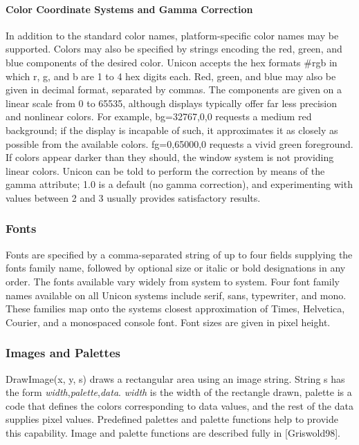 \paragraph{Color Coordinate Systems and Gamma Correction}
In addition to the standard color names, platform-specific color names
may be supported. Colors may also be specified by strings encoding the
red, green, and blue components of the desired color. Unicon accepts
the hex formats {\textquotedbl}\#rgb{\textquotedbl} in which r, g, and
b are 1 to 4 hex digits each. Red, green, and blue may also be given
in decimal format, separated by commas. The components are given on a
linear scale from 0 to 65535, although displays typically offer far
less precision and nonlinear colors. For example,
{\textquotedbl}bg=32767,0,0{\textquotedbl} requests a medium red
background; if the display is incapable of such, it approximates it as
closely as possible from the available colors.
{\textquotedbl}fg=0,65000,0{\textquotedbl} requests a vivid green
foreground. If colors appear darker than they should, the window system
is not providing linear colors. Unicon can be told to perform the
correction by means of the gamma attribute; 1.0 is a default (no gamma
correction), and experimenting with values between 2 and 3 usually
provides satisfactory results.

\subsubsection{Fonts}

Fonts are specified by a comma-separated string of up to four fields
supplying the font{\textquotesingle}s family name, followed by optional
size or italic or bold designations in any order. The fonts available
vary widely from system to system. Four font family names available on
all Unicon systems include serif, sans, typewriter, and mono. These
families map onto the system{\textquotesingle}s closest approximation
of Times, Helvetica, Courier, and a monospaced console font. Font sizes
are given in pixel height.

\subsubsection{Images and Palettes}

DrawImage(x, y, s) draws a rectangular area using an image string.
String s has the form
{\textquotedbl}\textit{width},\textit{palette},\textit{data}{\textquotedbl}.
\textit{width} is the width of the rectangle drawn, palette is a code
that defines the colors corresponding to data values, and the rest of
the data supplies pixel values. Predefined palettes and palette
functions help to provide this capability. Image and palette
functions are described fully in [Griswold98].

